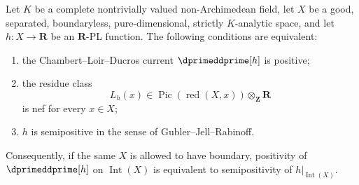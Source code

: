 \begin{theorem}
\label{thm:p01-real-pl-positive-current-candidate}
Let $K$ be a complete nontrivially valued non-Archimedean field, let $X$
be a good, separated, boundaryless, pure-dimensional, strictly
$K$-analytic space, and let
$h:X\to\mathbf R$ be an $\mathbf R$-PL function.  The following conditions
are equivalent:
\begin{enumerate}
\item the Chambert--Loir--Ducros current
      $\dprimeddprime[h]$ is positive;
\item the residue class
      \[
      L_h(x)\in\operatorname{Pic}(\operatorname{red}(X,x))
                    \otimes_{\mathbf Z}\mathbf R
      \]
      is nef for every $x\in X$;
\item $h$ is semipositive in the sense of Gubler--Jell--Rabinoff.
\end{enumerate}
Consequently, if the same $X$ is allowed to have boundary, positivity of
$\dprimeddprime[h]$ on $\operatorname{Int}(X)$ is equivalent to
semipositivity of $h|_{\operatorname{Int}(X)}$.
\end{theorem}

